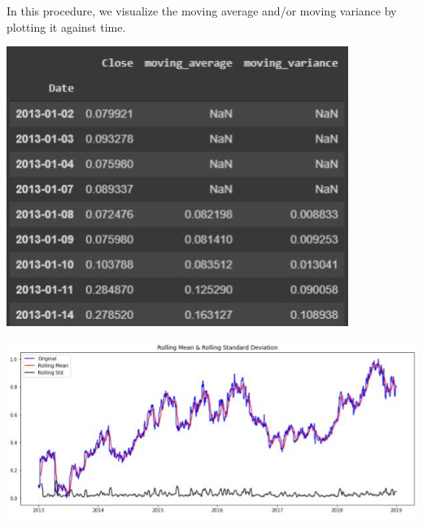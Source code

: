 			In this procedure, we visualize the moving average and/or moving variance by plotting it against time.

		\begin{center}
		\includegraphics[width=\linewidth]{figures/Moving-Average-and-Moving-Variance.jpg}	
		\label{fig: Moving Average and Moving Variance of the Closing Price with window size = 5}
		\end{center}

		\begin{center}
		\includegraphics[width=\linewidth]{figures/Plot-of-the-Rolling-Mean-and-the-Rolling-Standard-Deviation.jpg}	
		\label{fig: Plot of the Rolling Mean and the Rolling Standard Deviation of Moving Average of Closing Price}
		\end{center}
	
